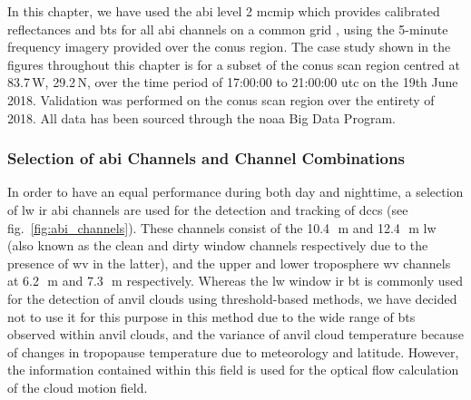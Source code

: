 In this chapter, we have used the \acrshort{abi} level 2 \acrfull{mcmip} which provides calibrated reflectances and \acrshort{bt}s for all \acrshort{abi} channels on a common grid \citep{schmit_chapter_2020}, using the 5-minute frequency imagery provided over the \acrshort{conus} region.
The case study shown in the figures throughout this chapter is for a subset of the \acrshort{conus} scan region centred at 83.7\,\textdegree W, 29.2\,\textdegree N, over the time period of 17:00:00 to 21:00:00 \acrshort{utc} on the 19th June 2018.
Validation was performed on the \acrshort{conus} scan region over the entirety of 2018.
All data has been sourced through the \acrshort{noaa} Big Data Program.



\subsubsection{Selection of \acrshort{abi} Channels and Channel Combinations} \label{sec:abi_channels}

In order to have an equal performance during both day and nighttime, a selection of \acrshort{lw} \acrshort{ir} \acrshort{abi} channels are used for the detection and tracking of \acrshort{dcc}s (see fig.~\ref{fig:abi_channels}). 
These channels consist of the 10.4\,\unit{\mu m} and 12.4\,\unit{\mu m} \acrshort{lw} (also known as the clean and dirty window channels respectively due to the presence of \acrshort{wv} in the latter), and the upper and lower troposphere \acrshort{wv} channels at 6.2\,\unit{\mu m} and 7.3\,\unit{\mu m} respectively.
Whereas the \acrshort{lw} window \acrshort{ir} \acrshort{bt} is commonly used for the detection of anvil clouds using threshold-based methods, we have decided not to use it for this purpose in this method due to the wide range of \acrshort{bt}s observed within anvil clouds, and the variance of anvil cloud temperature because of changes in tropopause temperature due to meteorology and latitude.
However, the information contained within this field is used for the optical flow calculation of the cloud motion field.


